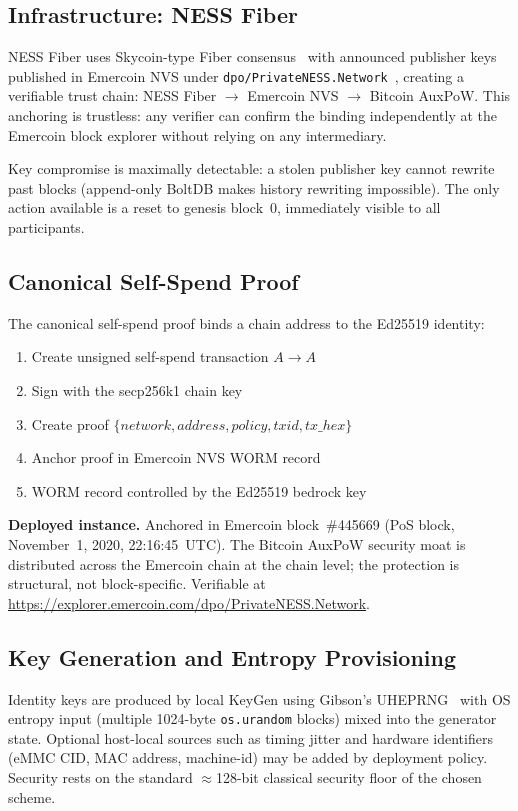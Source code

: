 \documentclass[12pt,a4paper]{article}
\begin{document}
\subsection{Infrastructure: NESS Fiber}

NESS Fiber uses Skycoin-type Fiber consensus~\cite{Skycoin} with
announced publisher keys published in Emercoin NVS under
\texttt{dpo/PrivateNESS.Network}~\cite{NESSFiber}, creating a verifiable
trust chain: NESS Fiber $\to$ Emercoin NVS $\to$ Bitcoin AuxPoW. This
anchoring is trustless: any verifier can confirm the binding
independently at the Emercoin block explorer without relying on any
intermediary.

Key compromise is maximally detectable: a stolen publisher key cannot
rewrite past blocks (append-only BoltDB makes history rewriting
impossible). The only action available is a reset to genesis block~0,
immediately visible to all participants.

\subsection{Canonical Self-Spend Proof}

The canonical self-spend proof binds a chain address to the Ed25519
identity:
\begin{enumerate}
  \item Create unsigned self-spend transaction $A \to A$
  \item Sign with the secp256k1 chain key
  \item Create proof $\{\mathit{network}, \mathit{address},
        \mathit{policy}, \mathit{txid}, \mathit{tx\_hex}\}$
  \item Anchor proof in Emercoin NVS WORM record
  \item WORM record controlled by the Ed25519 bedrock key
\end{enumerate}

\textbf{Deployed instance.} Anchored in Emercoin block~\#445669 (PoS
block, November~1, 2020, 22:16:45~UTC). The Bitcoin AuxPoW security
moat is distributed across the Emercoin chain at the chain level; the
protection is structural, not block-specific. Verifiable at
\url{https://explorer.emercoin.com/dpo/PrivateNESS.Network}.

\subsection{Key Generation and Entropy Provisioning}

Identity keys are produced by local KeyGen using Gibson's
UHEPRNG~\cite{UHEPRNG} with OS entropy input (multiple
1024-byte \texttt{os.urandom} blocks) mixed into the generator state.
Optional host-local sources such as timing jitter and hardware
identifiers (eMMC CID, MAC address, machine-id) may be added by deployment policy.
Security rests on the standard $\approx$128-bit classical security floor of the chosen scheme.
\end{document}
